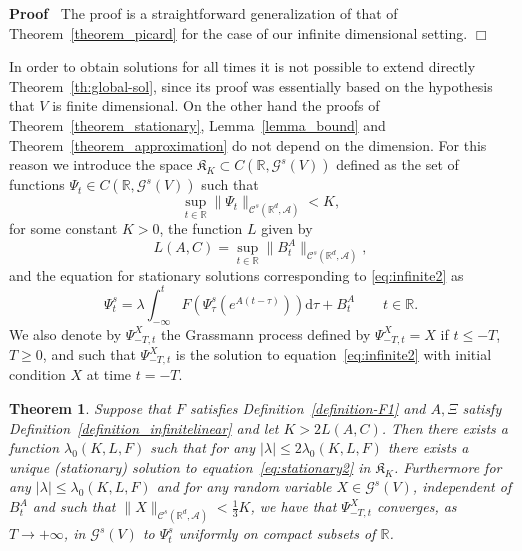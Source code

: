 \documentclass{article}
\newcommand{\mathd}{\mathrm{d}}
\newenvironment{proof}{\noindent\textbf{Proof\ }}{\hspace*{\fill}$\Box$\medskip}
\newtheorem{theorem}{Theorem}
\begin{document}
\begin{proof}
  The proof is a straightforward generalization of that of
  Theorem~\ref{theorem_picard} for the case of our infinite dimensional
  setting.
\end{proof}

In order to obtain solutions for all times it is not possible to extend
directly Theorem~\ref{th:global-sol}, since its proof was essentially based on
the hypothesis that $V$ is finite dimensional. On the other hand the proofs of
Theorem~\ref{theorem_stationary}, Lemma~\ref{lemma_bound} and
Theorem~\ref{theorem_approximation} do not depend on the dimension. For this
reason we introduce the space $\mathfrak{K}_K \subset C (\mathbb{R},
\mathcal{G}^s (V))$ defined as the set of functions $\Psi_t \in C (\mathbb{R},
\mathcal{G}^s (V))$ such that
\[ \sup_{t \in \mathbb{R}} \| \Psi_t \|_{\mathcal{C}^s (\mathbb{R}^d,
   \mathcal{A})} < K, \]
for some constant $K > 0$, the function $L$ given by
\[ L (A, C) = \sup_{t \in \mathbb{R}} \| B^A_t \|_{\mathcal{C}^s
   (\mathbb{R}^d, \mathcal{A})}, \]
and the equation for stationary solutions corresponding to
{\eqref{eq:infinite2}} as
\begin{equation}
  \Psi_t^s = \lambda \int_{- \infty}^t F (\Psi_{\tau}^s (e^{A (t - \tau)}))
  \mathd \tau + B^A_t \label{eq:stationary2} \qquad t \in \mathbb{R}.
\end{equation}
We also denote by $\Psi_{- T, t}^X$ the Grassmann process defined by $\Psi_{-
T, t}^X = X$ if $t \leqslant - T$, $T \geqslant 0$, and such that $\Psi_{- T,
t}^X$ is the solution to equation~{\eqref{eq:infinite2}} with initial
condition $X$ at time $t = - T$. \

\begin{theorem}
  \label{theorem_longtime2}Suppose that $F$ satisfies
  Definition~\ref{definition-F1} and $A, \Xi$ satisfy
  Definition~\ref{definition_infinitelinear} and let $K > 2 L (A, C)$. Then
  there exists a function $\lambda_0 (K, L, F)$ such that for any $| \lambda |
  \leqslant 2 \lambda_0 (K, L, F)$ there exists a unique (stationary) solution
  to equation~{\eqref{eq:stationary2}} in $\mathfrak{K}_K$. Furthermore for
  any $| \lambda | \leqslant \lambda_0 (K, L, F)$ and for any random variable
  $X \in \mathcal{G}^s_{\mathcal{}} (V)$, independent of $B^A_t$ and such that
  $\| X \|_{\mathcal{C}^s (\mathbb{R}^d, \mathcal{A})} < \frac{1}{3} K$, we
  have that $\Psi^X_{- T, t}$ converges, as $T \rightarrow + \infty$, in
  $\mathcal{G}^s (V)$ to $\Psi^s_t$ uniformly on compact subsets of
  $\mathbb{R}$.
\end{theorem}
\end{document}

